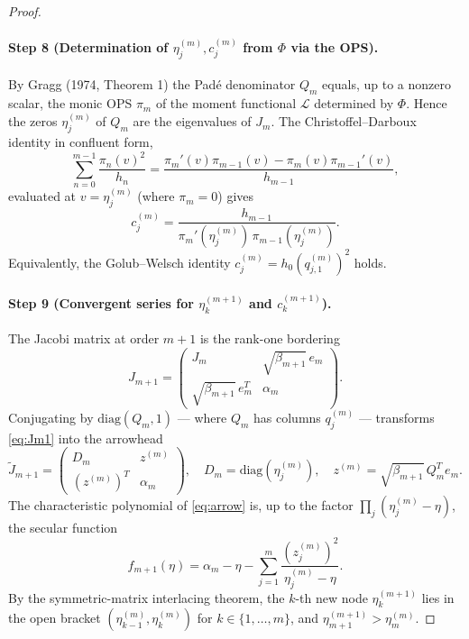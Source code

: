 \documentclass{article}
\newcommand{\cL}{\mathcal{L}}
\begin{document}
\begin{proof}
\paragraph{Step 8 (Determination of $\eta_j^{(m)}, c_j^{(m)}$ from
$\Phi$ via the OPS).}
By Gragg (1974, Theorem 1) the Pad\'e denominator $Q_m$ equals,
up to a nonzero scalar, the monic OPS $\pi_m$ of the moment
functional $\cL$ determined by $\Phi$.  Hence the zeros
$\eta_j^{(m)}$ of $Q_m$ are the eigenvalues of $J_m$.  The
Christoffel--Darboux identity in confluent form,
\begin{equation}\label{eq:CD}
  \sum_{n=0}^{m-1}\frac{\pi_n(v)^2}{h_n}
  = \frac{\pi_m'(v)\pi_{m-1}(v) - \pi_m(v)\pi_{m-1}'(v)}{h_{m-1}},
\end{equation}
evaluated at $v = \eta_j^{(m)}$ (where $\pi_m = 0$) gives
\begin{equation}\label{eq:cj_CD}
  c_j^{(m)} = \frac{h_{m-1}}{\pi_m'(\eta_j^{(m)})\,\pi_{m-1}(\eta_j^{(m)})}.
\end{equation}
Equivalently, the Golub--Welsch identity $c_j^{(m)} = h_0(q_{j,1}^{(m)})^2$
holds.

\paragraph{Step 9 (Convergent series for $\eta_k^{(m+1)}$ and
$c_k^{(m+1)}$).}
The Jacobi matrix at order $m+1$ is the rank-one bordering
\begin{equation}\label{eq:Jm1}
  J_{m+1} = \begin{pmatrix}
    J_m & \sqrt{\beta_{m+1}}\,e_m \\
    \sqrt{\beta_{m+1}}\,e_m^T & \alpha_m
  \end{pmatrix}.
\end{equation}
Conjugating by $\mathrm{diag}(Q_m,1)$ — where $Q_m$ has columns
$q_j^{(m)}$ — transforms \eqref{eq:Jm1} into the arrowhead
\begin{equation}\label{eq:arrow}
  \widetilde{J}_{m+1} = \begin{pmatrix}
    D_m & z^{(m)} \\ (z^{(m)})^T & \alpha_m
  \end{pmatrix},
  \quad D_m = \mathrm{diag}(\eta_j^{(m)}),
  \quad z^{(m)} = \sqrt{\beta_{m+1}}\,Q_m^T e_m.
\end{equation}
The characteristic polynomial of \eqref{eq:arrow} is, up to the
factor $\prod_j(\eta_j^{(m)}-\eta)$, the secular function
\begin{equation}\label{eq:secular}
  f_{m+1}(\eta) = \alpha_m - \eta
    - \sum_{j=1}^m\frac{(z_j^{(m)})^2}{\eta_j^{(m)} - \eta}.
\end{equation}
By the symmetric-matrix interlacing theorem, the $k$-th new node
$\eta_k^{(m+1)}$ lies in the open bracket
$(\eta_{k-1}^{(m)},\eta_k^{(m)})$ for $k\in\{1,\dots,m\}$, and
$\eta_{m+1}^{(m+1)} > \eta_m^{(m)}$.


\end{proof}
\end{document}
